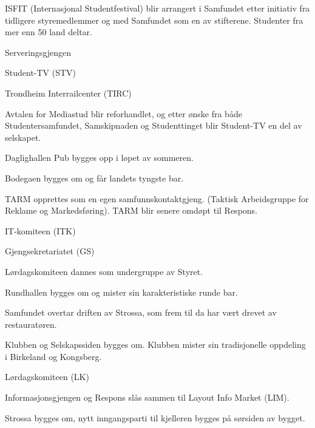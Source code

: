   \item ISFIT (Internasjonal Studentfestival) blir arrangert i Samfundet etter initiativ fra tidligere styremedlemmer og
med Samfundet som en av stifterene. Studenter fra mer enn 50 land deltar.
\yearend 

  \item Serveringsgjengen
  \item Student-TV (STV)
\yearend 

  \item Trondheim Interrailcenter (TIRC) 
\yearend 

  \item Avtalen for Mediastud blir reforhandlet, og etter ønske fra både Studentersamfundet, Samskipnaden og
Studenttinget blir Student-TV en del av selskapet.
\yearend 

  \item Daglighallen Pub bygges opp i løpet av sommeren.
  \item Bodegaen bygges om og får landets tyngste bar.
\yearend 

  \item  TARM opprettes som en egen samfunnskontaktgjeng. (Taktisk Arbeidsgruppe for Reklame og Markedsføring). TARM blir senere omdøpt til Respons.
\yearend 

  \item IT-komiteen (ITK)
  \item Gjengsekretariatet (GS)
  \item Lørdagskomiteen dannes som undergruppe av Styret.
  \item Rundhallen bygges om og mister sin karakteristiske runde bar.
\yearend 

  \item Samfundet overtar driften av Strossa, som frem til da har vært drevet av restauratøren. 
\yearend 

  \item Klubben og Selskapssiden bygges om. Klubben mister sin tradisjonelle oppdeling i Birkeland og Kongsberg.
\yearend 

  \item Lørdagskomiteen (LK)
\yearend 

  \item Informasjonsgjengen og Respons slås sammen til Layout Info Market (LIM).
  \item Strossa bygges om, nytt inngangsparti til kjelleren bygges på sørsiden av bygget.
\yearend 

